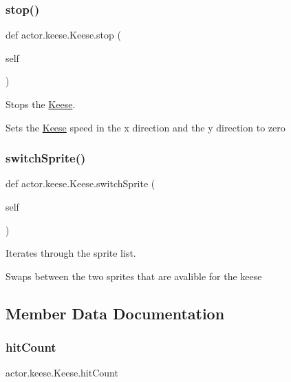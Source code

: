 \subsubsection{\texorpdfstring{stop()}{stop()}}
{\footnotesize\ttfamily def actor.\+keese.\+Keese.\+stop (\begin{DoxyParamCaption}\item[{}]{self }\end{DoxyParamCaption})}



Stops the \hyperlink{classactor_1_1keese_1_1_keese}{Keese}. 

Sets the \hyperlink{classactor_1_1keese_1_1_keese}{Keese} speed in the x direction and the y direction to zero \mbox{\label{classactor_1_1keese_1_1_keese_aee33f864229b0a7aa9a8b1d258ed696b}} 
\subsubsection{\texorpdfstring{switch\+Sprite()}{switchSprite()}}
{\footnotesize\ttfamily def actor.\+keese.\+Keese.\+switch\+Sprite (\begin{DoxyParamCaption}\item[{}]{self }\end{DoxyParamCaption})}



Iterates through the sprite list. 

Swaps between the two sprites that are avalible for the keese 

\subsection{Member Data Documentation}
\mbox{\label{classactor_1_1keese_1_1_keese_a4cb2d09574c5b9590ea9f9d30c942a16}} 
\subsubsection{\texorpdfstring{hit\+Count}{hitCount}}
{\footnotesize\ttfamily actor.\+keese.\+Keese.\+hit\+Count}



